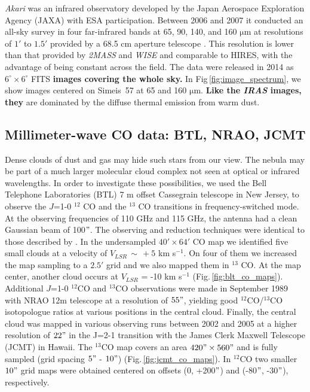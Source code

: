 \documentclass{aa}
\begin{document}
\par {\it Akari} was an infrared observatory developed by the Japan
Aerospace Exploration Agency (JAXA) with ESA participation. Between
2006 and 2007 it conducted an all-sky survey in four far-infrared
bands at 65, 90, 140, and 160 $\mathrm{\mu m}$ at resolutions of $1'$
to $1.5'$ provided by a 68.5 cm aperture telescope
\citep{AkariPaper}. This resolution is lower than that provided by
{\it 2MASS} and {\it WISE} and comparable to HIRES, with the advantage
of being constant across the field. The data were released in 2014 as
$6^{\circ}\times6^{\circ}$ FITS {\bf images covering the whole sky.}
In Fig\,\ref{fig:image_spectrum}, we show images centered on Simeis~57
at 65 and 160 $\mathrm{\mu m}$. {\bf Like the {\it IRAS} images, they}
are dominated by the diffuse thermal emission from warm dust.
 
 
 
\subsection{Millimeter-wave CO data: BTL, NRAO, JCMT}

Dense clouds of dust and gas may hide such stars from our view. The
nebula may be part of a much larger molecular cloud complex not seen
at optical or infrared wavelengths. In order to investigate these
possibilities, we used the Bell Telephone Laboratories (BTL) 7 m
offset Cassegrain telescope in New Jersey, to observe the $J$=1-0
$^{12}$ CO and the $^{13}$ CO transitions in frequency-switched
mode. At the observing frequencies of 110 GHz and 115 GHz, the antenna
had a clean Gaussian beam of 100$"$. The observing and reduction
techniques were identical to those described by \cite{Bally1987}.  In
the undersampled $40'\times64'$ CO map we identified five small clouds
at a velocity of $V_{LSR}\,\sim\,+5$ km s$^{-1}$.  On four of them we
increased the map sampling to a $2.5'$ grid and we also mapped them in
$^{13}$ CO. At the map center, another cloud occurs at $V_{LSR}$ = -10
km s$^{-1}$ (Fig.\,\ref{fig:blt_co_maps}). Additional $J$=1-0
$^{12}$CO and $^{13}$CO observations were made in September 1989 with
NRAO 12m telescope at a resolution of $55"$, yielding good
$^{12}$CO/$^{13}$CO isotopologue ratios at various positions in the
central cloud.  Finally, the central cloud was mapped in various
observing runs between 2002 and 2005 at a higher resolution of $22"$
in the J=2-1 transition with the James Clerk Maxwell Telescope (JCMT)
in Hawaii. The $^{13}$CO map covers an area $420"\times560"$ and is
fully sampled (grid spacing $5"$ - $10"$)
(Fig.\,\ref{fig:jcmt_co_maps}). In $^{12}$CO two smaller $10"$ grid
maps were obtained centered on offsets (0, +200$"$) and (-80$"$,
-30$"$), respectively.
\end{document}
